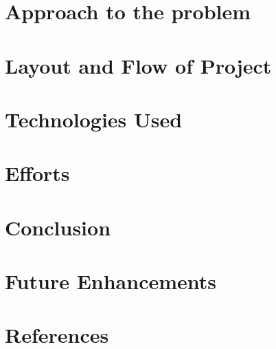 \documentclass[10pt]{report}
\begin{document}
{\section{Approach to the problem}

\section{Layout and Flow of Project}

\section{Technologies Used}

\section{Efforts}

\section{Conclusion}

\section{Future Enhancements}

\section{References}

}
\end{document}
